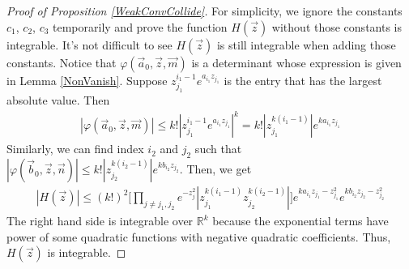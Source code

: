 \begin{proof}[Proof of Proposition \ref{WeakConvCollide}]
For simplicity, we ignore the constants $c_{1}$, $c_{2}$, $c_{3}$ temporarily and prove the function $H(\vec{z})$ without those constants is integrable. It's not difficult to see $H(\vec{z})$ is still integrable when adding those constants. Notice that $\varphi(\vec{a}_{0},\vec{z},\vec{m})$ is a determinant whose expression is given in Lemma \ref{NonVanish}. Suppose $z_{j_1}^{i_1-1}e^{a_{i_1}z_{j_1}}$ is the entry that has the largest absolute value. Then 
\begin{align*}
	|\varphi(\vec{a}_{0},\vec{z},\vec{m})|\leq k!|z_{j_{1}}^{i_{1}-1}e^{a_{i_1}z_{j_1}}|^{k}=k!|z_{j_1}^{k(i_1-1)}|e^{ka_{i_1}z_{j_1}}
\end{align*}
Similarly, we can find index $i_2$ and $j_{2}$ such that $|\varphi(\vec{b}_{0},\vec{z},\vec{n})|\leq k!|z_{j_2}^{k(i_2-1)}|e^{kb_{i_2}z_{j_2}}$. Then, we get 
\begin{align*}
	|H(\vec{z})|\leq (k!)^{2}\big[\prod_{j\neq j_1,j_2}e^{-z_{j}^{2}}|z_{j_1}^{k(i_1-1)}z_{j_2}^{k(i_2-1)}|\big]e^{ka_{i_1}z_{j_1}-z_{j_1}^2}e^{kb_{i_2}z_{j_2}-z_{j_2}^{2}}
\end{align*}
The right hand side is integrable over $\mathbb{R}^{k}$ because the exponential terms have power of some quadratic functions with negative quadratic coefficients. Thus, $H(\vec{z})$ is integrable.


\end{proof}
